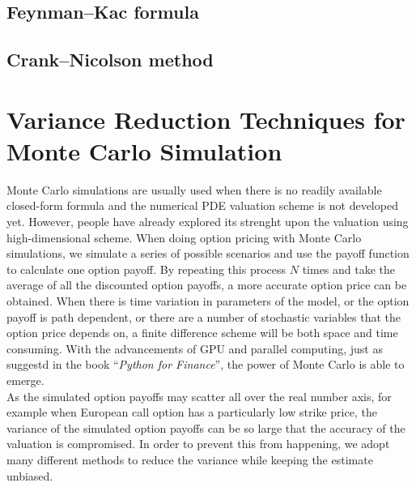 \subsection{Feynman–Kac formula}
\newpage
\subsection{Crank–Nicolson method}
\newpage

\section{Variance Reduction Techniques for Monte Carlo Simulation}
Monte Carlo simulations are usually used when there is no readily available closed-form formula and the numerical PDE valuation scheme is not developed yet. However, people have already explored its strenght upon the valuation using high-dimensional scheme. When doing option pricing with Monte Carlo simulations, we simulate a series of possible scenarios and use the payoff function to calculate one option payoff. By repeating this process $N$ times and take the average of all the discounted option payoffs, a more accurate option price can be obtained. When there is time variation in parameters of the model, or the option payoff is path dependent, or there are a number of stochastic variables that the option price depends on, a finite difference scheme will be both space and time consuming. With the advancements of GPU and parallel computing, just as suggestd in the book ``\emph{Python for Finance}'', the power of Monte Carlo is able to emerge.\\
As the simulated option payoffs may scatter all over the real number axis, for example when European call option has a particularly low strike price, the variance of the simulated option payoffs can be so large that the accuracy of the valuation is compromised. In order to prevent this from happening, we adopt many different methods to reduce the variance while keeping the estimate unbiased.
\newpage
